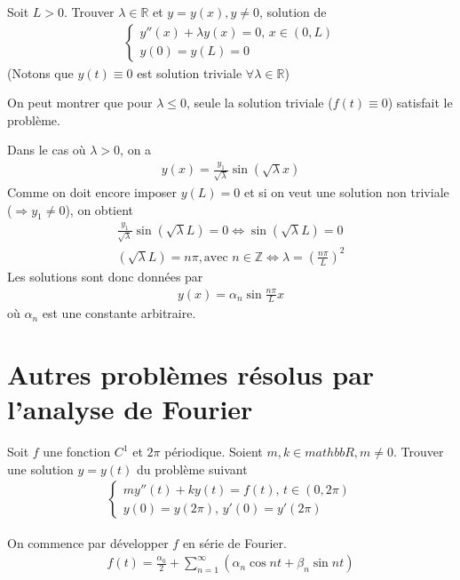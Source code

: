 \begin{myExample}
	Soit $L>0$. Trouver $\lambda\in\mathbb R$ et $y=y(x), y\neq 0$, solution de 
	\begin{eqnarray}
		\begin{cases}
			y''(x)+\lambda y(x)=0,\,x\in(0,L)
			\\
			y(0)=y(L)=0
		\end{cases}
	\end{eqnarray}
		(Notons que $y(t)\equiv0$ est solution triviale $\forall\lambda\in\mathbb R$)
		
	On peut montrer que pour $\lambda\leq0$, seule la solution triviale ($f(t)\equiv0$) satisfait le problème.
	
	Dans le cas où $\lambda>0$, on a
	\begin{eqnarray}
		y(x)=\frac{y_1}{\sqrt \lambda}\sin{(\sqrt\lambda x)}
	\end{eqnarray}
	Comme on doit encore imposer $y(L)=0$ et si on veut une solution non triviale ($\Rightarrow y_1\neq0$), on obtient
	\begin{eqnarray*}
		\frac{y_1}{\sqrt \lambda}\sin{(\sqrt\lambda L)}=0\Leftrightarrow\sin{(\sqrt\lambda L)}=0
		\\
		(\sqrt\lambda L)=n\pi,\text{avec }n\in\mathbb Z\Leftrightarrow \lambda=(\frac{n\pi}{L})^2
	\end{eqnarray*}
	Les solutions sont donc données par
	\begin{eqnarray}
		y(x)=\alpha_n\sin{\frac{n\pi}{L}x}
	\end{eqnarray}
	où $\alpha_n$ est une constante arbitraire.
\end{myExample}

\section{Autres problèmes résolus par l'analyse de Fourier}

\begin{myExample}
	Soit $f$ une fonction $C^1$ et $2\pi$ périodique. Soient $m, k\in mathbb R, m\neq0$. Trouver une solution $y=y(t)$ du problème suivant
	\begin{eqnarray}
		\begin{cases}
			my''(t)+ky(t)=f(t),\,t\in(0,2\pi)
			\\
			y(0)=y(2\pi),\,y'(0)=y'(2\pi)
		\end{cases}
	\end{eqnarray}
	
	On commence par développer $f$ en série de Fourier.
	\begin{eqnarray*}
		f(t)=\frac{\alpha_0}{2}+\sum_{n=1}^{\infty}(\alpha_n\cos{nt}+\beta_n\sin{nt})
	\end{eqnarray*}
\end{myExample}

\label{sub:17.ex3}
